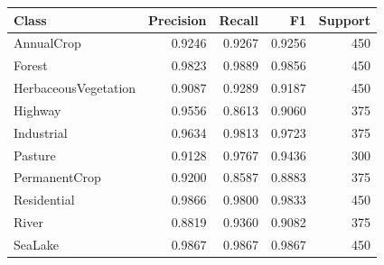 \begin{tabular}{lrrrr}
\toprule
Class & Precision & Recall & F1 & Support \\
\midrule
AnnualCrop & 0.9246 & 0.9267 & 0.9256 & 450 \\
Forest & 0.9823 & 0.9889 & 0.9856 & 450 \\
HerbaceousVegetation & 0.9087 & 0.9289 & 0.9187 & 450 \\
Highway & 0.9556 & 0.8613 & 0.9060 & 375 \\
Industrial & 0.9634 & 0.9813 & 0.9723 & 375 \\
Pasture & 0.9128 & 0.9767 & 0.9436 & 300 \\
PermanentCrop & 0.9200 & 0.8587 & 0.8883 & 375 \\
Residential & 0.9866 & 0.9800 & 0.9833 & 450 \\
River & 0.8819 & 0.9360 & 0.9082 & 375 \\
SeaLake & 0.9867 & 0.9867 & 0.9867 & 450 \\
\bottomrule
\end{tabular}

